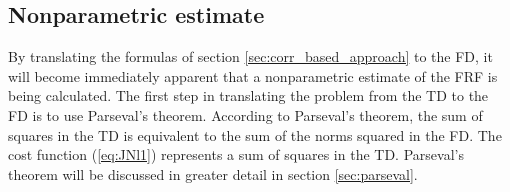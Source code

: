 
\subsection{Nonparametric estimate}
By translating the formulas of section \ref{sec:corr_based_approach} to the FD, it will become immediately apparent that a nonparametric estimate of the FRF is being calculated. The first step in translating the problem from the TD to the FD is to use Parseval's theorem. According to Parseval's theorem, the sum of squares in the TD is equivalent to the sum of the norms squared in the FD. The cost function (\ref{eq:JNl1}) represents a sum of squares in the TD. Parseval's theorem will be discussed in greater detail in section \ref{sec:parseval}.

